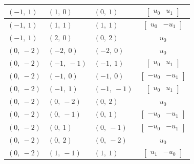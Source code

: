 \documentclass[11pt]{article}
\theoremstyle{definition}
\begin{document}
\begin{longtable}{|l|l|l|c|}
    \hline
    $\left( -1, \  1\right)$ & $\left( 1, \  0\right)$ & $\left( 0, \  1\right)$ & $\left[\begin{matrix}u_{0} & u_{1}\end{matrix}\right]$ \\
    \hline
    $\left( -1, \  1\right)$ & $\left( 1, \  1\right)$ & $\left( 1, \  1\right)$ & $\left[\begin{matrix}u_{0} & - u_{1}\end{matrix}\right]$ \\
    \hline
    $\left( -1, \  1\right)$ & $\left( 2, \  0\right)$ & $\left( 0, \  2\right)$ & $u_{0}$ \\
    \hline
    $\left( 0, \  -2\right)$ & $\left( -2, \  0\right)$ & $\left( -2, \  0\right)$ & $u_{0}$ \\
    \hline
    $\left( 0, \  -2\right)$ & $\left( -1, \  -1\right)$ & $\left( -1, \  1\right)$ & $\left[\begin{matrix}u_{0} & u_{1}\end{matrix}\right]$ \\
    \hline
    $\left( 0, \  -2\right)$ & $\left( -1, \  0\right)$ & $\left( -1, \  0\right)$ & $\left[\begin{matrix}- u_{0} & - u_{1}\end{matrix}\right]$ \\
    \hline
    $\left( 0, \  -2\right)$ & $\left( -1, \  1\right)$ & $\left( -1, \  -1\right)$ & $\left[\begin{matrix}u_{0} & u_{1}\end{matrix}\right]$ \\
    \hline
    $\left( 0, \  -2\right)$ & $\left( 0, \  -2\right)$ & $\left( 0, \  2\right)$ & $u_{0}$ \\
    \hline
    $\left( 0, \  -2\right)$ & $\left( 0, \  -1\right)$ & $\left( 0, \  1\right)$ & $\left[\begin{matrix}- u_{0} & - u_{1}\end{matrix}\right]$ \\
    \hline
    $\left( 0, \  -2\right)$ & $\left( 0, \  1\right)$ & $\left( 0, \  -1\right)$ & $\left[\begin{matrix}- u_{0} & - u_{1}\end{matrix}\right]$ \\
    \hline
    $\left( 0, \  -2\right)$ & $\left( 0, \  2\right)$ & $\left( 0, \  -2\right)$ & $u_{0}$ \\
    \hline
    $\left( 0, \  -2\right)$ & $\left( 1, \  -1\right)$ & $\left( 1, \  1\right)$ & $\left[\begin{matrix}u_{1} & - u_{0}\end{matrix}\right]$ \\

\end{longtable}
\end{document}
